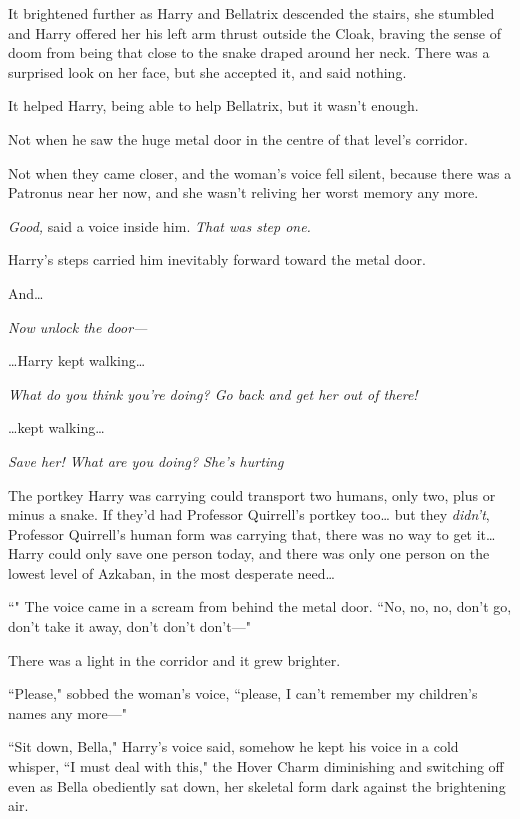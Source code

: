 It brightened further as Harry and Bellatrix descended the stairs, she stumbled and Harry offered her his left arm thrust outside the Cloak, braving the sense of doom from being that close to the snake draped around her neck. There was a surprised look on her face, but she accepted it, and said nothing.

It helped Harry, being able to help Bellatrix, but it wasn't enough.

Not when he saw the huge metal door in the centre of that level's corridor.

Not when they came closer, and the woman's voice fell silent, because there was a Patronus near her now, and she wasn't reliving her worst memory any more.

\emph{Good,} said a voice inside him. \emph{That was step one.}

Harry's steps carried him inevitably forward toward the metal door.

And{\ldots}

\emph{Now unlock the door—}

{\ldots}Harry kept walking{\ldots}

\emph{What do you think you're doing? Go back and get her out of there!}

{\ldots}kept walking{\ldots}

\emph{Save her! What are you doing? She's hurting }

The portkey Harry was carrying could transport two humans, only two, plus or minus a snake. If they'd had Professor Quirrell's portkey too{\ldots} but they \emph{didn't}, Professor Quirrell's human form was carrying that, there was no way to get it{\ldots} Harry could only save one person today, and there was only one person on the lowest level of Azkaban, in the most desperate need{\ldots}

``" The voice came in a scream from behind the metal door. ``No, no, no, don't go, don't take it away, don't don't don't—"

There was a light in the corridor and it grew brighter.

``Please," sobbed the woman's voice, ``please, I can't remember my children's names any more—"

``Sit down, Bella," Harry's voice said, somehow he kept his voice in a cold whisper, ``I must deal with this," the Hover Charm diminishing and switching off even as Bella obediently sat down, her skeletal form dark against the brightening air.

